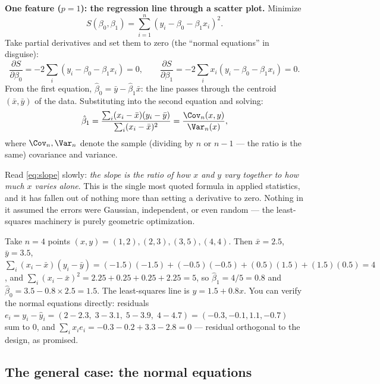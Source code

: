 \textbf{One feature ($p=1$): the regression line through a scatter plot.} Minimize
\[
  S(\beta_0, \beta_1) = \sum_{i=1}^n (y_i - \beta_0 - \beta_1 x_i)^2.
\]
Take partial derivatives and set them to zero (the ``normal equations'' in disguise):
\[
  \frac{\partial S}{\partial \beta_0} = -2 \sum_i (y_i - \beta_0 - \beta_1 x_i) = 0,
  \qquad
  \frac{\partial S}{\partial \beta_1} = -2 \sum_i x_i (y_i - \beta_0 - \beta_1 x_i) = 0.
\]
From the first equation, $\hat{\beta}_0 = \bar{y} - \hat{\beta}_1 \bar{x}$: the line passes through the centroid $(\bar{x}, \bar{y})$ of the data. Substituting into the second equation and solving:
\begin{equation}\label{eq:slope}
  \hat{\beta}_1 = \frac{\sum_i (x_i - \bar{x})(y_i - \bar{y})}{\sum_i (x_i - \bar{x})^2} = \frac{\Cov_n(x, y)}{\Var_n(x)},
\end{equation}
where $\Cov_n, \Var_n$ denote the sample (dividing by $n$ or $n-1$ — the ratio is the same) covariance and variance.

Read \eqref{eq:slope} slowly: \emph{the slope is the ratio of how $x$ and $y$ vary together to how much $x$ varies alone}. This is the single most quoted formula in applied statistics, and it has fallen out of nothing more than setting a derivative to zero. Nothing in it assumed the errors were Gaussian, independent, or even random — the least-squares machinery is purely geometric optimization.

\begin{example}\label{ex:hand}
Take $n = 4$ points $(x, y) = (1, 2), (2, 3), (3, 5), (4, 4)$. Then $\bar{x} = 2.5$, $\bar{y} = 3.5$,
$\sum_i (x_i - \bar{x})(y_i - \bar{y}) = (-1.5)(-1.5) + (-0.5)(-0.5) + (0.5)(1.5) + (1.5)(0.5) = 4$, and $\sum_i (x_i - \bar{x})^2 = 2.25 + 0.25 + 0.25 + 2.25 = 5$, so $\hat{\beta}_1 = 4/5 = 0.8$ and $\hat{\beta}_0 = 3.5 - 0.8 \times 2.5 = 1.5$. The least-squares line is $y = 1.5 + 0.8x$. You can verify the normal equations directly: residuals $e_i = y_i - \hat{y}_i = (2 - 2.3,\; 3 - 3.1,\; 5 - 3.9,\; 4 - 4.7) = (-0.3, -0.1, 1.1, -0.7)$ sum to $0$, and $\sum_i x_i e_i = -0.3 - 0.2 + 3.3 - 2.8 = 0$ — residual orthogonal to the design, as promised.
\end{example}

\subsection{The general case: the normal equations}

